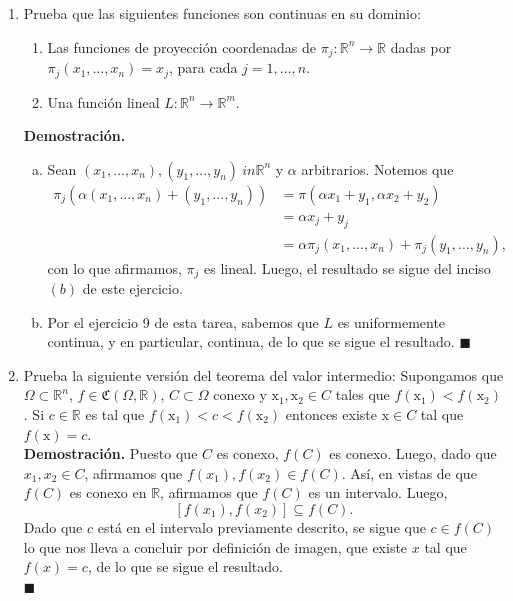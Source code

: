 \documentclass[12pt]{article}
\newcommand{\Co}{\mathfrak C}
\newcommand{\R}{\mathbb R}
\newcommand{\x}{\mathrm x}
\newcommand{\To}{\longrightarrow}
\begin{document}
\begin{enumerate}
\newpage
\item Prueba que las siguientes funciones son continuas en su dominio:
\begin{enumerate}[(1)]
\item Las funciones de proyección coordenadas de $\pi_j:\R^n\To \R$ dadas por $\pi_j(x_1,\ldots,x_n)=x_j$, para cada $j=1,\ldots,n$.
\item Una función lineal $L:\R^n\To \R^m$.
\end{enumerate}
\textbf{Demostración.}
\begin{enumerate}[(b)]
    \item Sean $(x_1,...,x_n),(y_1,...,y_n) \ in \R^n$ y $\alpha$ arbitrarios. Notemos que
    \begin{align*}
        \pi_j(\alpha(x_1,...,x_n)+(y_1,...,y_n)) &= \pi(\alpha x_1+y_1,\alpha x_2+y_2) \\
        &= \alpha x_j + y_j \\
        &= \alpha \pi_j(x_1,...,x_n) + \pi_j(y_1,...,y_n),
    \end{align*}
    con lo que afirmamos, $\pi_j$ es lineal. Luego, el resultado se sigue del inciso $(b)$ de este ejercicio.
    \item Por el ejercicio 9 de esta tarea, sabemos que $L$ es uniformemente continua, y en particular, continua, de lo que se sigue el resultado. \hfill $\blacksquare$
\end{enumerate}

\item Prueba la siguiente versión del teorema del valor intermedio: Supongamos que $\Omega\subset \R^n$, $f\in \Co(\Omega,\R)$, $C\subset \Omega$ conexo y 
$\x_1,\x_2\in C$ tales que $f(\x_1)<f(\x_2)$. Si $c\in \R$ es tal que 
$f(\x_1)<c<f(\x_2)$ entonces existe $\x\in C$ tal que $f(\x)=c$. \\
\textbf{Demostración.} Puesto que $C$ es conexo, $f(C)$ es conexo.
Luego, dado que $x_1,x_2 \in C$, afirmamos que $f(x_1),f(x_2) \in f(C)$.
Así, en vistas de que $f(C)$ es conexo en $\R$, afirmamos que $f(C)$ es un intervalo. Luego,
\[
[f(x_1),f(x_2)] \subseteq f(C).
\]
Dado que $c$ está en el intervalo previamente descrito, se sigue que $c \in f(C)$ lo que nos lleva a concluir por definición de imagen, que existe $x$ tal que $f(x)=c$, de lo que se sigue el resultado. \\
\hfill $\blacksquare$



\end{enumerate}
\end{document}
